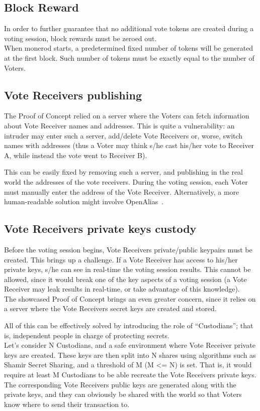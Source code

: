 \documentclass[10pt, letterpaper]{article}
\begin{document}
\subsection{Block Reward}
In order to further guarantee that no additional vote tokens are created during a voting session,  block rewards must be zeroed out.\\
When monerod starts, a predetermined fixed number of tokens will be generated at the first block. Such number of tokens must be exactly equal to the number of Voters.
\subsection{Vote Receivers publishing}
The Proof of Concept relied on a server where the Voters can fetch information about Vote Receiver names and addresses. This is quite a vulnerability: an intruder may enter such a server, add/delete Vote Receivers or, worse, switch names with addresses (thus a Voter may think s/he cast his/her vote to Receiver A, while instead the vote went to Receiver B).
\bigskip

This can be easily fixed by removing such a server, and publishing in the real world the addresses of the vote receivers. During the voting session, each Voter must manually enter the address of the Vote Receiver. Alternatively, a more human-readable solution might involve OpenAlias~\cite{OpenAlias:Online}.

\subsection{Vote Receivers private keys custody}
Before the voting session begins, Vote Receivers private/public keypairs must be created.
This brings up a challenge. If a Vote Receiver has access to his/her private keys, s/he can see in real-time the voting session results. This cannot be allowed, since it would break one of the key aspects of a voting session (a Vote Receiver may leak results in real-time, or take advantage of this knowledge).\\
The showcased Proof of Concept brings an even greater concern, since it relies on a server where the Vote Receivers secret keys are created and stored.
\bigskip

All of this can be effectively solved by introducing the role of “Custodians”; that is, independent people in charge of protecting secrets.\\
Let’s consider N Custodians, and a safe environment where Vote Receiver private keys are created. These keys are then split into N shares using algorithms such as Shamir Secret Sharing, and a threshold of M (M <= N) is set. That is, it would require at least M Custodians to be able recreate the Vote Receivers private keys.\\
The corresponding Vote Receivers public keys are generated along with the private keys, and they can obviously be shared with the world so that Voters know where to send their transaction to.
\bigskip
\end{document}
